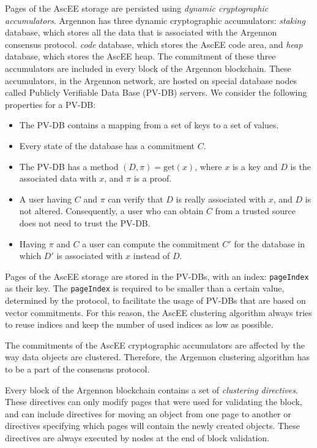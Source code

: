 Pages of the AscEE storage are persisted using \emph{dynamic cryptographic accumulators}. Argennon
has three dynamic cryptographic accumulators: \emph{staking} database, which stores all the data that is associated with
the Argennon consensus protocol. \emph{code} database, which stores the AscEE code area, and \emph{heap} database,
which stores the AscEE heap. The commitment of these three accumulators are included in every block of the Argennon
blockchain. These accumulators, in the Argennon network, are hosted on special database nodes called Publicly
Verifiable Data Base (PV-DB) servers.
We consider the following properties for a PV-DB:
\begin{itemize}
    \item The PV-DB contains a mapping from a set of keys to a set of values.
    \item Every state of the database has a commitment \(C\).
    \item The PV-DB has a method \((D, \pi) = \text{get}(x)\), where \(x\) is a key and \(D\) is the associated data
    with \(x\), and \(\pi\) is a proof.
    \item A user having \(C\) and \(\pi\) can verify that \(D\) is really associated with \(x\), and \(D\) is not
    altered. Consequently, a user who can obtain \(C\) from a trusted source does not need to trust the PV-DB\@.
    \item Having \(\pi\) and \(C\) a user can compute the commitment \(C'\) for the database in which \(D'\) is
    associated with \(x\) instead of \(D\).
\end{itemize}

Pages of the AscEE storage are stored in the PV-DBs, with an index: \texttt{pageIndex} as their key.
The \texttt{pageIndex} is required to be smaller than a certain value, determined by the
protocol, to facilitate the usage of PV-DBs that are based on vector commitments.
For this reason, the AscEE clustering algorithm always tries to reuse indices and keep the number of used indices
as low as possible.

The commitments of the AscEE cryptographic accumulators are affected by the way data objects are clustered. Therefore,
the Argennon clustering algorithm has to be a part of the consensus protocol.

Every block of the Argennon blockchain contains a set of \emph{clustering directives}. These directives
can only modify pages that were used for validating the block, and can
include directives for moving an object from one page to another or directives specifying which pages will contain
the newly created objects. These directives are always executed by nodes at the end of block validation.

